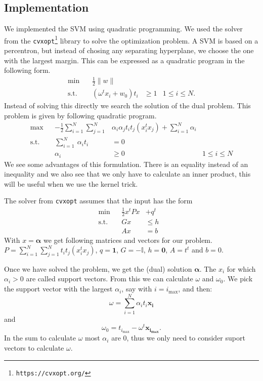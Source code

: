 \subsection{Implementation}
We implemented the SVM using quadratic programming. We used the solver from the \texttt{cvxopt\footnote{https://cvxopt.org/}} library to solve the optimization problem. A SVM is based on a percentron, but instead of chosing any separating hyperplane, we choose the one with the largest margin. This can be expressed as a quadratic program in the following form.
\begin{align*}
	\min&&\, \frac{1}{2}\lVert w \rVert&&  \\
	\text{s.t.}&&\, (\omega^tx_i+w_0)t_i &\geq1& 1 \leq i \leq N.
\end{align*}
Instead of solving this directly we search the solution of the dual problem. This problem is given by following quadratic program.
\begin{align*}
	\max&& - \frac{1}{2} \sum\limits_{i=1}^N \sum\limits_{j=1}^N&\alpha_i\alpha_jt_it_j(x_i^tx_j) +  \sum\limits_{i=1}^N \alpha_i &\\
	\text{s.t.}&& \sum\limits_{i=1}^N\ \alpha_i t_i &= 0& \\
	&&\alpha_i&\geq0& 1\leq i \leq N
\end{align*}
We see some advantages of this formulation. There is an equality instead of an inequality and we also see that we only have to calculate an inner product, this will be useful when we use the kernel trick.

The solver from \texttt{cvxopt} assumes that the input has the form
\begin{align*}
	\min&& \frac{1}{2} x^tPx &+ q^t&\\
	\text{s.t.}&&Gx&\leq h& \\
	&&Ax&=b& 
\end{align*}
With $x=\bm{\alpha}$ we get following matrices and vectors for our problem. $P=\sum\limits_{i=1}^N \sum\limits_{j=1}^Nt_it_j(x_i^tx_j)$, $q=\bm{1}$, 
$G=-\mathbb{I}$, $h=\bm{0}$, $A=t^t$ and $b=0$.

Once we have solved the problem, we get the (dual) solution $\bm{\alpha}$. The $x_i$ for which $\alpha_i>0$ are called support vectors. From this we can calculate $\omega$ and $\omega_0$. We pick the support vector with the largest $\alpha_i$, say with $i = i_{\max}$, and then:
\[
	\omega = \sum\limits_{i=1}^N\alpha_i t_i \bm{x_i}
\]
and 
\[
	\omega_0 = t_{i_{\max}} - \omega^t\bm{x_{i_{\max}}}.
\]
In the sum to calculate $\omega$ most $\alpha_i$ are $0$, thus we only need to consider suport vectors to calculate $\omega$.

